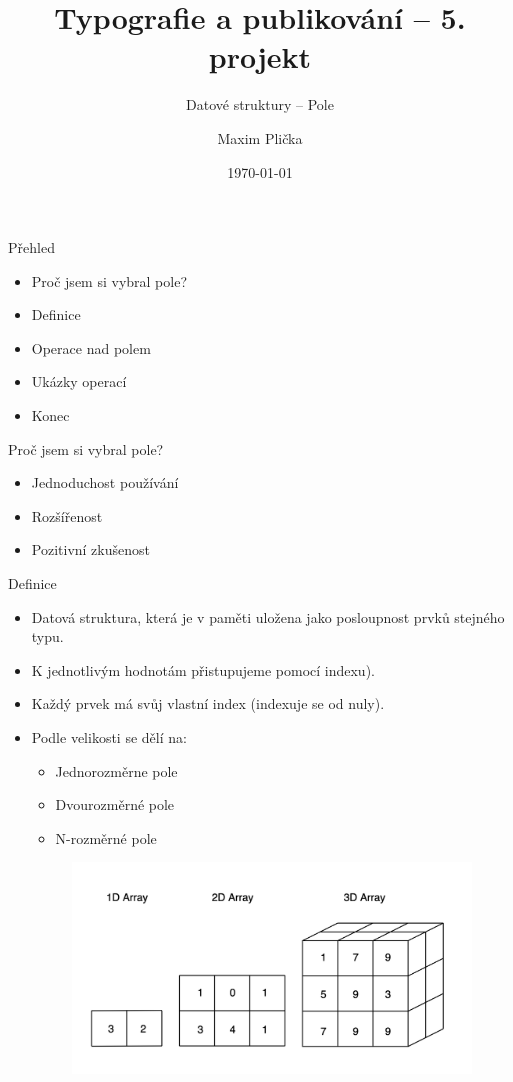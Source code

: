 \documentclass[10pt, hyperref={unicode}]{beamer}
\title{Typografie a publikování -- 5. projekt}
\subtitle{Datové struktury -- Pole}
\author{Maxim Plička}
\date{\today}
\institute
{
	Vysoké učení technické v Brně\\
	Fakulta informačních technologií
}
\begin{document}
\maketitle

\begin{frame}{Přehled}
\begin{itemize}
    \item Proč jsem si vybral pole?
    \item Definice
    \item Operace nad polem
    \item Ukázky operací
    \item Konec
\end{itemize}
\end{frame}

\begin{frame}{Proč jsem si vybral pole?}
\begin{itemize}
    \item Jednoduchost používání
    \item Rozšířenost
    \item Pozitivní zkušenost
\end{itemize}
\end{frame}

\begin{frame}{Definice}
\begin{itemize}
    \item Datová struktura, která je v paměti uložena jako posloupnost prvků stejného typu.
    \item K jednotlivým hodnotám přistupujeme pomocí indexu).
    \item Každý prvek má svůj vlastní index (indexuje se od nuly).
    \item Podle velikosti se dělí na: 
    \begin{itemize}
          \item Jednorozměrne pole
          \item Dvourozměrné pole
          \item N-rozměrné pole
    \end{itemize}
    \begin{figure}[t]
    \includegraphics[scale=0.12]{array.png}
    \end{figure}
\end{itemize}
\end{frame}
\end{document}
